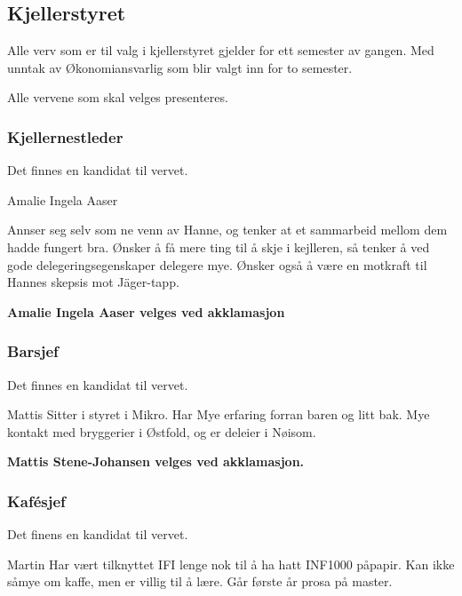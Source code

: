 \documentclass[10pt,norsk,a4paper,usenames,dvipsnames]{article}
\begin{document}
\begin{multicols}
    \subsection{Kjellerstyret} %
        Alle verv som er til valg i kjellerstyret gjelder for ett semester av gangen. Med unntak av Økonomiansvarlig som blir valgt inn for to semester.

        Alle vervene som skal velges presenteres.

        \subsubsection{Kjellernestleder}
            Det finnes en kandidat til vervet.

            Amalie Ingela Aaser

            Annser seg selv som ne venn av Hanne, og tenker at et sammarbeid mellom dem hadde fungert bra. Ønsker å få mere ting til å skje i kejlleren, så tenker å ved gode delegeringsegenskaper delegere mye. Ønsker også å være en motkraft til Hannes skepsis mot Jäger-tapp.

            \textbf{Amalie Ingela Aaser velges ved akklamasjon}



        \subsubsection{Barsjef}
            Det finnes en kandidat til vervet.

            Mattis
            Sitter i styret i Mikro. Har Mye erfaring forran baren og litt bak. Mye kontakt med bryggerier i Østfold, og er deleier i Nøisom.

            \textbf{Mattis Stene-Johansen velges ved akklamasjon.}


        \subsubsection{Kafésjef}
            Det finens en kandidat til vervet.

            Martin
            Har vært tilknyttet IFI lenge nok til å ha hatt INF1000 påpapir. Kan ikke såmye om kaffe, men er villig til å lære. Går første år prosa på master.


\end{multicols}
\end{document}
